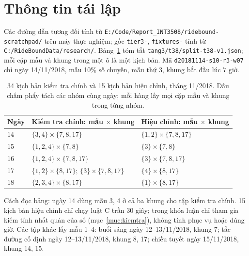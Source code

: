 \section{Thông tin tái lập}
\label{phuluc:C}
\setcounter{table}{0}

Các đường dẫn tương đối tính từ \nolinkurl{E:/Code/Report_INT3508/ridebound-scratchpad/} trên máy thực nghiệm; gốc \texttt{tier3-}, \texttt{fixtures-} tính từ \nolinkurl{C:/RideBoundData/research/}. Bảng~\ref{bang:pl-danhsach} tóm tắt \nolinkurl{tang3/t38/split-t38-v1.json}; mỗi cặp mẫu và khung trong một ô là một kịch bản. Mã \nolinkurl{d20181114-s10-r3-w07} chỉ ngày 14/11/2018, mẫu 10\% số chuyến, mẫu thứ 3, khung bắt đầu lúc 7 giờ.

\begin{table}[htbp]
\centering
\caption[Danh sách kịch bản kiểm tra chính và hiệu chỉnh]{34 kịch bản kiểm tra chính và 15 kịch bản hiệu chỉnh, tháng 11/2018. Dấu chấm phẩy tách các nhóm cùng ngày; mỗi hàng lấy mọi cặp mẫu và khung trong từng nhóm.}
\label{bang:pl-danhsach}
\small
\begin{tabular}{@{}p{1.5cm}p{6.8cm}p{6.5cm}@{}}
\toprule
\textbf{Ngày} & \textbf{Kiểm tra chính: mẫu $\times$ khung} & \textbf{Hiệu chỉnh: mẫu $\times$ khung} \\
\midrule
14 & $\{3,4\}\times\{7,8,17\}$ & $\{1,2\}\times\{7,8,17\}$ \\
15 & $\{1,2,4\}\times\{7,8\}$ & $\{3\}\times\{7,8\}$ \\
16 & $\{1,2,4\}\times\{7,8,17\}$ & $\{3\}\times\{7,8,17\}$ \\
17 & $\{1,2\}\times\{8,17\}$; $\{3\}\times\{7,8,17\}$ & $\{4\}\times\{8,17\}$ \\
18 & $\{2,3,4\}\times\{8,17\}$ & $\{1\}\times\{8,17\}$ \\
\bottomrule
\end{tabular}
\end{table}

Cách đọc bảng: ngày 14 dùng mẫu 3, 4 ở cả ba khung cho tập kiểm tra chính. 15 kịch bản hiệu chỉnh chỉ chạy luật C trần 30 giây; trong khóa luận chỉ tham gia kiểm tính nhất quán của sổ (mục~\ref{muc:kiemtra}), không tính phục vụ hoặc đúng giờ. Các tập khác lấy mẫu 1--4: buổi sáng ngày 12--13/11/2018, khung 7; tắc đường cố định ngày 12--13/11/2018, khung 8, 17; chiều tuyết ngày 15/11/2018, khung 14, 15.

